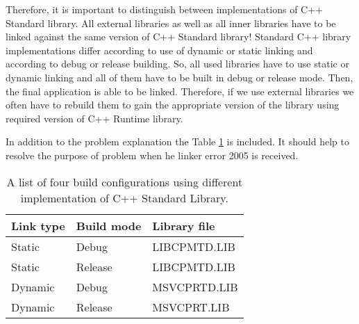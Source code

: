 Therefore, it is important to distinguish between implementations of C++ Standard library. All external libraries as well as all inner libraries have to be linked against the same version of C++ Standard library! Standard C++ library implementations differ according to use of dynamic or static linking and according to debug or release building. So, all used libraries have to use static or dynamic linking and all of them have to be built in debug or release mode. Then, the final application is able to be linked. Therefore, if we use external libraries we often have to rebuild them to gain the appropriate version of the library using required version of C++ Runtime library.

In addition to the problem explanation the Table \ref{standardlibrarytable} is included. It should help to resolve the purpose of problem when he linker error 2005 is received. 

\begin{table}
    \caption{A list of four build configurations using different implementation of C++ Standard Library.\label{standardlibrarytable}}
\begin{center}
	\begin{tabular}{| l| l | l |}
	  \hline                       
	  Link type & Build mode & Library file \\
	  \hline
	  \hline                     
	  Static & Debug & LIBCPMTD.LIB\\
	  \hline
	  Static & Release & LIBCPMTD.LIB\\
	  \hline  
	  Dynamic & Debug & MSVCPRTD.LIB\\
	  \hline  
	  Dynamic & Release & MSVCPRT.LIB\\  
	  \hline  
	\end{tabular}
\end{center}
\end{table}




